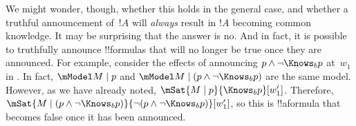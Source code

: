 \documentclass[../../../include/open-logic-section]{subfiles}
\begin{document}
We might wonder, though, whether this holds in the general case, and
whether a truthful announcement of~$!A$ will \emph{always} result in
$!A$ becoming common knowledge. It may be surprising that the answer
is no. And in fact, it is possible to truthfully announce
!!{formula}s that will no longer be true once they are announced. For
example, consider the effects of announcing $p \land \lnot \Knows_b p$
at~$w_1$ in . In fact, $\mModel M \mid
p$ and $\mModel M \mid (p \land \lnot \Knows_b p)$ are the same model.
However, as we have already noted, $\mSat{M \mid p}{\Knows_b
p}[w'_1]$. Therefore, $\mSat{M \mid (p \land \lnot \Knows_b p)}{\lnot
(p \land \lnot \Knows_b p)}[w'_1]$, so this is !!a{formula} that becomes
false once it has been announced. 
\end{document}

